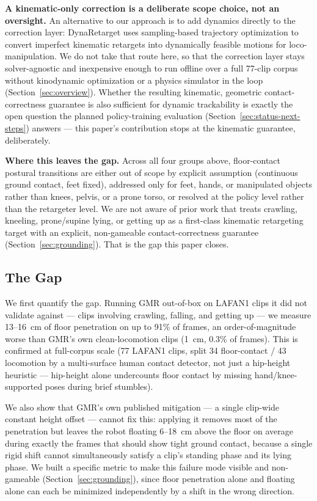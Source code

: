 \noindent\textbf{A kinematic-only correction is a deliberate scope choice,
not an oversight.} An alternative to our approach is to add dynamics
directly to the correction layer: DynaRetarget
\cite{dhedin2026dynaretarget} uses sampling-based trajectory optimization to
convert imperfect kinematic retargets into dynamically feasible motions for
loco-manipulation. We do not take that route here, so that the correction
layer stays solver-agnostic and inexpensive enough to run offline over a
full 77-clip corpus without kinodynamic optimization or a physics simulator
in the loop (Section~\ref{sec:overview}). Whether the resulting kinematic,
geometric contact-correctness guarantee is also sufficient for dynamic
trackability is exactly the open question the planned policy-training
evaluation (Section~\ref{sec:status-next-steps}) answers --- this paper's
contribution stops at the kinematic guarantee, deliberately.

\noindent\textbf{Where this leaves the gap.} Across all four groups above,
floor-contact postural transitions are either out of scope by explicit
assumption (continuous ground contact, feet fixed), addressed only for
feet, hands, or manipulated objects rather than knees, pelvis, or a prone
torso, or resolved at the policy level rather than the retargeter level. We
are not aware of prior work that treats crawling, kneeling, prone/supine
lying, or getting up as a first-class kinematic retargeting target with an
explicit, non-gameable contact-correctness guarantee
(Section~\ref{sec:grounding}). That is the gap this paper closes.

\subsection{The Gap}
\label{sec:gap}

We first quantify the gap. Running GMR out-of-box on LAFAN1 clips it did not
validate against --- clips involving crawling, falling, and getting up ---
we measure 13--16~cm of floor penetration on up to 91\% of frames, an
order-of-magnitude worse than GMR's own clean-locomotion clips (1~cm, 0.3\%
of frames). This is confirmed at full-corpus scale (77 LAFAN1 clips, split
34 floor-contact / 43 locomotion by a multi-surface human contact detector,
not just a hip-height heuristic --- hip-height alone undercounts floor
contact by missing hand/knee-supported poses during brief stumbles).

We also show that GMR's own published mitigation --- a single clip-wide
constant height offset --- cannot fix this: applying it removes most of the
penetration but leaves the robot floating 6--18~cm above the floor on
average during exactly the frames that should show tight ground contact,
because a single rigid shift cannot simultaneously satisfy a clip's standing
phase and its lying phase. We built a specific metric to make this failure
mode visible and non-gameable (Section~\ref{sec:grounding}), since floor
penetration alone and floating alone can each be minimized independently by
a shift in the wrong direction.

